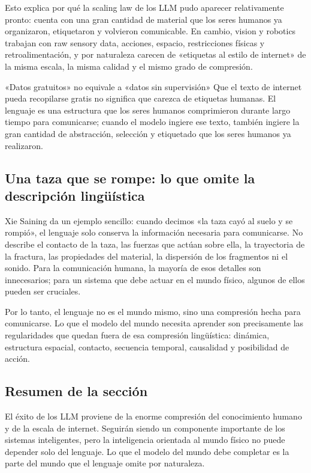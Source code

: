 \documentclass[a4paper]{article}
\begin{document}
Esto explica por qué la scaling law de los LLM pudo aparecer relativamente pronto: cuenta con una gran cantidad de material que los seres humanos ya organizaron, etiquetaron y volvieron comunicable. En cambio, vision y robotics trabajan con raw sensory data, acciones, espacio, restricciones físicas y retroalimentación, y por naturaleza carecen de «etiquetas al estilo de internet» de la misma escala, la misma calidad y el mismo grado de compresión.

\begin{warningbox}{«Datos gratuitos» no equivale a «datos sin supervisión»}
Que el texto de internet pueda recopilarse gratis no significa que carezca de etiquetas humanas. El lenguaje es una estructura que los seres humanos comprimieron durante largo tiempo para comunicarse; cuando el modelo ingiere ese texto, también ingiere la gran cantidad de abstracción, selección y etiquetado que los seres humanos ya realizaron.
\end{warningbox}

\subsection{Una taza que se rompe: lo que omite la descripción lingüística}

Xie Saining da un ejemplo sencillo: cuando decimos «la taza cayó al suelo y se rompió», el lenguaje solo conserva la información necesaria para comunicarse. No describe el contacto de la taza, las fuerzas que actúan sobre ella, la trayectoria de la fractura, las propiedades del material, la dispersión de los fragmentos ni el sonido. Para la comunicación humana, la mayoría de esos detalles son innecesarios; para un sistema que debe actuar en el mundo físico, algunos de ellos pueden ser cruciales.

Por lo tanto, el lenguaje no es el mundo mismo, sino una compresión hecha para comunicarse. Lo que el modelo del mundo necesita aprender son precisamente las regularidades que quedan fuera de esa compresión lingüística: dinámica, estructura espacial, contacto, secuencia temporal, causalidad y posibilidad de acción.

\subsection{Resumen de la sección}

El éxito de los LLM proviene de la enorme compresión del conocimiento humano y de la escala de internet. Seguirán siendo un componente importante de los sistemas inteligentes, pero la inteligencia orientada al mundo físico no puede depender solo del lenguaje. Lo que el modelo del mundo debe completar es la parte del mundo que el lenguaje omite por naturaleza.
\end{document}
